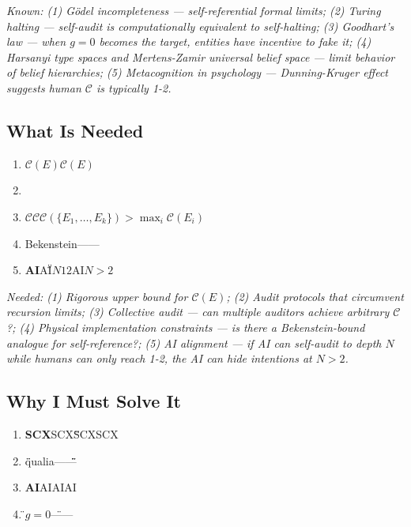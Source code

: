 \documentclass[12pt,a4paper]{article}
\theoremstyle{remark}
\begin{document}
\medskip
\noindent\textit{Known: (1) Gödel incompleteness — self-referential formal limits; (2) Turing halting — self-audit is computationally equivalent to self-halting; (3) Goodhart's law — when $g=0$ becomes the target, entities have incentive to fake it; (4) Harsanyi type spaces and Mertens-Zamir universal belief space — limit behavior of belief hierarchies; (5) Metacognition in psychology — Dunning-Kruger effect suggests human $\mathcal{C}$ is typically 1-2.}

\subsection{ What Is Needed}

\begin{enumerate}[label=(\arabic*)]
    \item \textbf{$\mathcal{C}(E)$}$\mathcal{C}(E)$
    
    \item \textbf{}\textbf{}
    
    \item \textbf{}$\mathcal{C}$$\mathcal{C}$$\mathcal{C}(\{E_1, \ldots, E_k\}) > \max_i \mathcal{C}(E_i)$
    
    \item \textbf{}Bekenstein——
    
    \item \textbf{AI}AI\"\"$N$$1$$2$AI$N > 2$
\end{enumerate}

\medskip
\noindent\textit{Needed: (1) Rigorous upper bound for $\mathcal{C}(E)$; (2) Audit protocols that circumvent recursion limits; (3) Collective audit — can multiple auditors achieve arbitrary $\mathcal{C}$?; (4) Physical implementation constraints — is there a Bekenstein-bound analogue for self-reference?; (5) AI alignment — if AI can self-audit to depth $N$ while humans can only reach 1-2, the AI can hide intentions at $N > 2$.}

\subsection{ Why I Must Solve It}

\begin{enumerate}[label=(\arabic*)]
    \item \textbf{SCX}SCX\"\"SCXSCX
    
    \item \textbf{}\"\"qualia\"\"\textit{}——\"\"\"\"
    
    \item \textbf{AI}AIAIAI
    
    \item \textbf{}\"$g=0$\"——
\end{enumerate}
\end{document}
